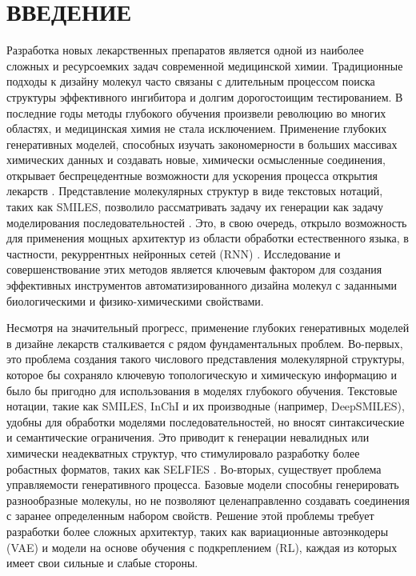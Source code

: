 \documentclass[../main.tex]{subfiles}
\begin{document}
\onlyinsubfile{
    \renewcommand{\contentsname}{ОГЛАВЛЕНИЕ}
    \setcounter{tocdepth}{3}
    \tableofcontents
}

\chapter*{\MakeUppercase{Введение}}

Разработка новых лекарственных препаратов является одной из наиболее сложных и ресурсоемких задач современной медицинской химии. Традиционные подходы к дизайну молекул часто связаны с длительным процессом поиска структуры эффективного ингибитора и долгим дорогостоищим тестированием. В последние годы методы глубокого обучения произвели революцию во многих областях, и медицинская химия не стала исключением. Применение глубоких генеративных моделей, способных изучать закономерности в больших массивах химических данных и создавать новые, химически осмысленные соединения, открывает беспрецедентные возможности для ускорения процесса открытия лекарств \cite{merk2018novo, mouchlis2021advances}. Представление молекулярных структур в виде текстовых нотаций, таких как SMILES, позволило рассматривать задачу их генерации как задачу моделирования последовательностей \cite{ertl2017silico}. Это, в свою очередь, открыло возможность для применения мощных архитектур из области обработки естественного языка, в частности, рекуррентных нейронных сетей (RNN) \cite{ertl2017silico}. Исследование и совершенствование этих методов является ключевым фактором для создания эффективных инструментов автоматизированного дизайна молекул с заданными биологическими и физико-химическими свойствами.

Несмотря на значительный прогресс, применение глубоких генеративных моделей в дизайне лекарств сталкивается с рядом фундаментальных проблем. Во-первых, это проблема создания такого числового представления молекулярной структуры, которое бы сохраняло ключевую топологическую и химическую информацию и было бы пригодно для использования в моделях глубокого обучения. Текстовые нотации, такие как SMILES, InChI и их производные (например, DeepSMILES), удобны для обработки моделями последовательностей, но вносят синтаксические и семантические ограничения. Это приводит к генерации невалидных или химически неадекватных структур, что стимулировало разработку более робастных форматов, таких как SELFIES \cite{wigh2022review}. Во-вторых, существует проблема управляемости генеративного процесса. Базовые модели способны генерировать разнообразные молекулы, но не позволяют целенаправленно создавать соединения с заранее определенным набором свойств. Решение этой проблемы требует разработки более сложных архитектур, таких как вариационные автоэнкодеры (VAE) и модели на основе обучения с подкреплением (RL), каждая из которых имеет свои сильные и слабые стороны.
\end{document}

